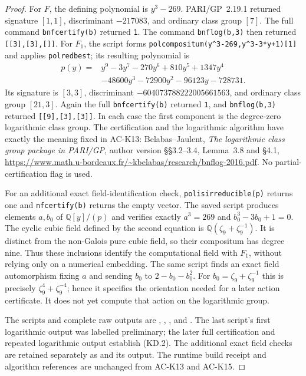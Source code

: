 \begin{proof}
For $F$, the defining polynomial is $y^3-269$.
PARI/GP~2.19.1 returned signature $[1,1]$, discriminant
$-217083$, and ordinary class group $[7]$.
The full command \texttt{bnfcertify(b)} returned \texttt{1}.
The command \texttt{bnflog(b,3)} then returned
\texttt{[[3],[3],[]]}.
For $F_1$, the script forms
\texttt{polcompositum(y\string^3-269,y\string^3-3*y+1)[1]}
and applies \texttt{polredbest}; its resulting polynomial is
\[
 \begin{split}
 p(y)={}&y^9-3y^7-270y^6+810y^5+1347y^4\\
        &-48600y^3-72900y^2-96123y-728731.
 \end{split}                                         \tag{KD.5}
\]
Its signature is $[3,3]$, discriminant
$-604073788222005661563$, and ordinary class group $[21,3]$.
Again the full \texttt{bnfcertify(b)} returned \texttt{1},
and \texttt{bnflog(b,3)} returned \texttt{[[9],[3],[3]]}.
In each case the first component is the degree-zero
logarithmic class group.  The certification and the
logarithmic algorithm have exactly the meaning fixed in
AC-K13: Belabas--Jaulent, \emph{The logarithmic class group
package in PARI/GP}, author version \S\S3.2--3.4,
Lemma~3.8 and \S4.1,
\url{https://www.math.u-bordeaux.fr/~kbelabas/research/bnflog-2016.pdf}.
No partial-certification flag is used.

For an additional exact field-identification check,
\texttt{polisirreducible(p)} returns one and
\texttt{nfcertify(b)} returns the empty vector.
The saved script produces elements $a,b_0$ of
$\mathbb Q[y]/(p)$ and verifies exactly
$a^3=269$ and $b_0^3-3b_0+1=0$.
The cyclic cubic field defined by the second equation
is $\mathbb Q(\zeta_9+\zeta_9^{-1})$.
It is distinct from the non-Galois pure cubic field,
so their compositum has degree nine.
Thus these inclusions identify the computational field
with $F_1$, without relying only on a numerical embedding.
The same script finds an exact field automorphism fixing
$a$ and sending $b_0$ to $2-b_0-b_0^2$.
For $b_0=\zeta_9+\zeta_9^{-1}$ this is precisely
$\zeta_9^4+\zeta_9^{-4}$; hence it specifies the orientation
needed for a later action certificate.
It does not yet compute that action on the logarithmic group.

The scripts and complete raw outputs are
,
,
, and
.
The last script's first logarithmic output was labelled
preliminary; the later full certification and repeated
logarithmic output establish (KD.2).
The additional exact field checks are retained separately
as  and its output.
The runtime build receipt and algorithm references are
unchanged from AC-K13 and AC-K15.


\end{proof}
